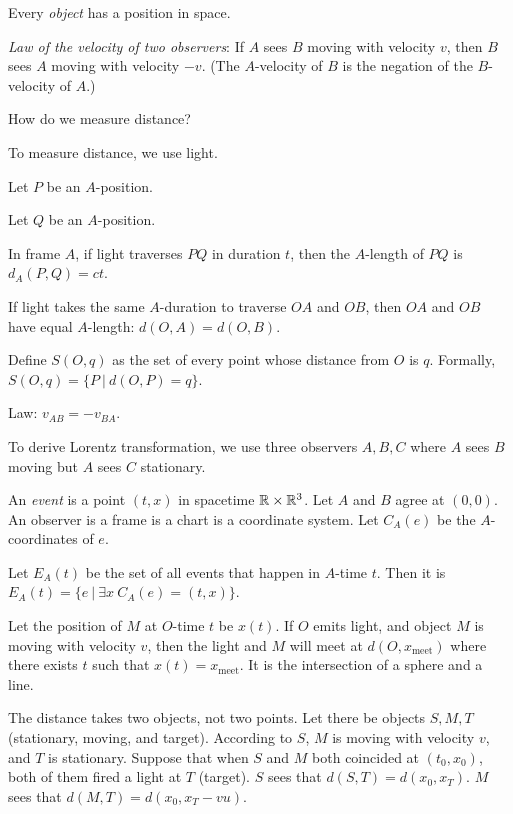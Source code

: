 Every \emph{object} has a position in space.

\emph{Law of the velocity of two observers}:
If \(A\) sees \(B\) moving with velocity \(v\),
then \(B\) sees \(A\) moving with velocity \(-v\).
(The \(A\)-velocity of \(B\) is the negation of the \(B\)-velocity of \(A\).)

How do we measure distance?

To measure distance, we use light.

Let \(P\) be an \(A\)-position.

Let \(Q\) be an \(A\)-position.

In frame \(A\),
if light traverses \(PQ\) in duration \(t\),
then the \(A\)-length of \(PQ\) is \(d_A(P,Q) = c t\).

If light takes the same \(A\)-duration to traverse \(OA\) and \(OB\),
then \(OA\) and \(OB\) have equal \(A\)-length: \(d(O,A) = d(O,B)\).

Define \(S(O,q)\) as the set of every point whose distance from \(O\) is \(q\).
Formally, \(S(O,q) = \{ P ~|~ d(O,P) = q \}\).

Law: \(v_{AB} = -v_{BA}\).

To derive Lorentz transformation, we use three observers \(A,B,C\)
where \(A\) sees \(B\) moving but \(A\) sees \(C\) stationary.

An \emph{event} is a point \((t,x)\) in spacetime \(\mathbb{R} \times \mathbb{R}^3\).
Let \(A\) and \(B\) agree at \((0,0)\).
An observer is a frame is a chart is a coordinate system.
Let \(C_A(e)\) be the \(A\)-coordinates of \(e\).

Let \(E_A(t)\) be the set of all events that happen in \(A\)-time \(t\).
Then it is \(E_A(t) = \{ e ~|~ \exists x ~ C_A(e) = (t,x) \}\).

Let the position of \(M\) at \(O\)-time \(t\) be \(x(t)\).
If \(O\) emits light, and object \(M\) is moving with velocity \(v\),
then the light and \(M\) will meet at \(d(O,x_\text{meet})\)
where there exists \(t\) such that \(x(t) = x_\text{meet}\).
It is the intersection of a sphere and a line.

The distance takes two objects, not two points.
Let there be objects \(S, M, T\) (stationary, moving, and target).
According to \(S\), \(M\) is moving with velocity \(v\), and \(T\) is stationary.
Suppose that when \(S\) and \(M\) both coincided at \((t_0,x_0)\),
both of them fired a light at \(T\) (target).
\(S\) sees that \(d(S,T) = d(x_0,x_T)\).
\(M\) sees that \(d(M,T) = d(x_0,x_T - vu)\).

